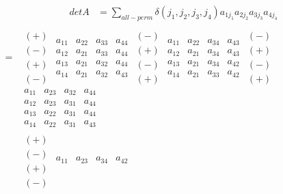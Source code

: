 \documentclass[a4paper,11pt,twoside]{report}
\begin{document}
\begin{align*}
detA &=   \sum_{all-perm}^{} \delta(j_1,j_2,j_3,j_4)a_{1j_{1}}a_{2j_{2}}a_{3j_{3}}a_{4j_{4}}\\
\end{align*}
\begin{align*}
	=&\begin{matrix} (+) \\ (-) \\ (+) \\ (-) \end{matrix}
	\begin{matrix} a_{11} & a_{22} & a_{33} & a_{44} \\
	a_{12} & a_{21} & a_{33} & a_{44} \\
a_{13} & a_{21} & a_{32} & a_{44} \\
a_{14} & a_{21} & a_{32} & a_{43}\end{matrix}
	\begin{matrix} (-) \\ (+) \\ (-) \\ (+) \end{matrix}
	\begin{matrix} a_{11} & a_{22} & a_{34} & a_{43} \\
	a_{12} & a_{21} & a_{34} & a_{43} \\
a_{13} & a_{21} & a_{34} & a_{42} \\
a_{14} & a_{21} & a_{33} & a_{42}\end{matrix}
	\begin{matrix} (-) \\ (+) \\ (-) \\ (+) \end{matrix}
	\begin{matrix} a_{11} & a_{23} & a_{32} & a_{44} \\
	a_{12} & a_{23} & a_{31} & a_{44} \\
a_{13} & a_{22} & a_{31} & a_{44} \\
a_{14} & a_{22} & a_{31} & a_{43}\end{matrix}
\\
&\begin{matrix} (+) \\ (-) \\ (+) \\ (-) \end{matrix}
	\begin{matrix} a_{11} & a_{23} & a_{34} & a_{42} \\

\end{matrix}
\end{align*}
\end{document}
